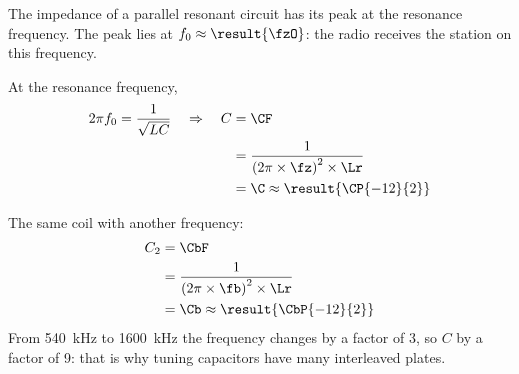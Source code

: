 \begin{abcliste}
\abc The impedance of a parallel resonant circuit has its peak at the resonance frequency. The peak lies at $f_0 \approx \result{\fzO}$: the radio receives the station on this frequency.

\abc At the resonance frequency,
\begin{align}
 2\pi f_0 = \frac{1}{\sqrt{L C}} \quad\Rightarrow\quad C &= \CF \\
   &= \frac{1}{\left(2\pi\times\fz\right)^2\times\Lr} \\
   &= \C \approx \result{\CP{-12}{2}}
\end{align}

\abc The same coil with another frequency:
\begin{align}
 C_2 &= \CbF \\
   &= \frac{1}{\left(2\pi\times\fb\right)^2\times\Lr} \\
   &= \Cb \approx \result{\CbP{-12}{2}}
\end{align}
From \SI{540}{\kilo\hertz} to \SI{1600}{\kilo\hertz} the frequency changes by a factor of 3, so $C$ by a factor of 9: that is why tuning capacitors have many interleaved plates.
\end{abcliste}
